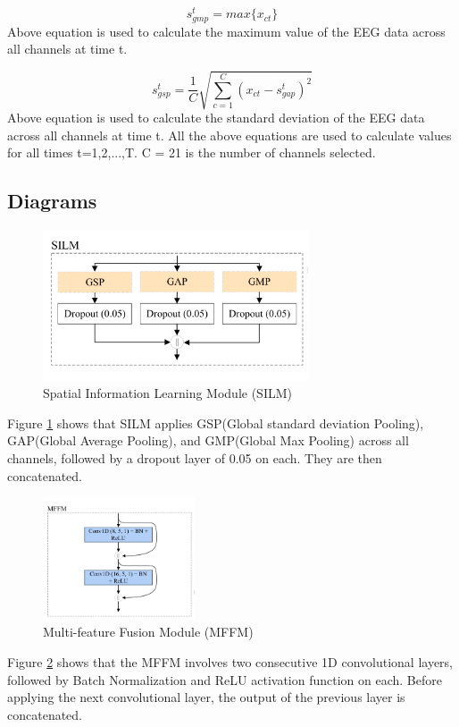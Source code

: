 \documentclass[10pt]{article}
\begin{document}
\[ s_{gmp}^t = max\{x_{ct}\} \]
Above equation is used to calculate the maximum value of the EEG data across all channels at time t.

\[ s_{gsp}^t = \frac{1}{C} \sqrt{\sum_{c=1}^{C} (x_{ct} - s_{gap}^t)^2} \]
Above equation is used to calculate the standard deviation of the EEG data across all channels at time t.
\newline
All the above equations are used to calculate values for all times t=1,2,...,T. C = 21 is the number of channels selected.

\subsection{Diagrams}
\begin{figure}[H]
    \centering
    \includegraphics[width=0.7\textwidth]{silm.png}
    \caption{Spatial Information Learning Module (SILM)}
    \label{fig:silm}
\end{figure}
Figure \ref{fig:silm} shows that SILM applies GSP(Global standard deviation Pooling), GAP(Global Average Pooling), and GMP(Global Max Pooling) across all channels, followed by a dropout layer of 0.05 on each. They are then concatenated.

\begin{figure}[H]
    \centering
    \includegraphics[width=0.4\textwidth]{mffm.png}
    \caption{Multi-feature Fusion Module (MFFM)}
    \label{fig:mffm}
\end{figure}
Figure \ref{fig:mffm} shows that the MFFM involves two consecutive 1D convolutional layers, followed by Batch Normalization and ReLU activation function on each. Before applying the next convolutional layer, the output of the previous layer is concatenated.
\end{document}
